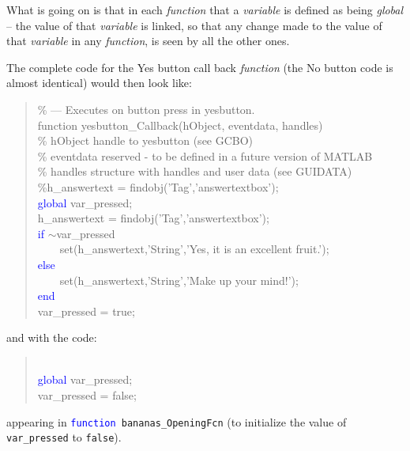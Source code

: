 \documentclass{tufte-book} %
\newenvironment{docspec}{\begin{quotation}\ttfamily\parskip0pt\parindent0pt\ignorespaces}{\end{quotation}}
\begin{document}
What is going on is that in each \textit{function} that a \textit{variable} is defined as being \textit{global} -- the value of that \textit{variable} is linked, so that any change made to the value of that \textit{variable} in any \textit{function}, is seen by all the other ones. 

The complete code for the \textsf{Yes} button call back \textit{function} (the \textsf{No} button code is almost identical) would then look like:
\begin{docspec}
\textcolor[rgb]{0,0.501961,0}{\% --- Executes on button press in yesbutton.}
\\function yesbutton\_Callback(hObject, eventdata, handles)
\textcolor[rgb]{0,0.501961,0}{\\\% hObject    handle to yesbutton (see GCBO)
\\\% eventdata  reserved - to be defined in a future version of MATLAB
\\\% handles    structure with handles and user data (see GUIDATA)
\\\%h\_answertext = findobj(\textcolor[rgb]{1,0,1}{'Tag'},\textcolor[rgb]{1,0,1}{'answertextbox'});}
\\\textcolor{blue}{global} \textcolor[rgb]{0,0.501961,1}{var\_pressed};
\\h\_answertext = findobj('Tag','answertextbox');
\\\textcolor{blue}{if} \(\sim\)\textcolor[rgb]{0,0.501961,1}{var\_pressed}
\\ \ \ \ \   set(h\_answertext,\textcolor[rgb]{1,0,1}{'String'},\textcolor[rgb]{1,0,1}{'Yes, it is an excellent fruit.'});
\\\textcolor{blue}{else}
\\ \ \ \ \   set(h\_answertext,\textcolor[rgb]{1,0,1}{'String'},\textcolor[rgb]{1,0,1}{'Make up your mind!'});
\\\textcolor{blue}{end}
\\\textcolor[rgb]{0,0.501961,1}{var\_pressed} = true;
\end{docspec}

\pagebreak

and with the code:
\vspace{-4mm}\begin{docspec}
\\\textcolor{blue}{global} \textcolor[rgb]{0,0.501961,1}{var\_pressed};\\
\textcolor[rgb]{0,0.501961,1}{var\_pressed} = false;
\end{docspec}\vspace{-1mm}
appearing in \texttt{\textcolor{blue}{function} bananas\_OpeningFcn} (to initialize the value of \texttt{var\_pressed} to \texttt{false}).
\end{document}
